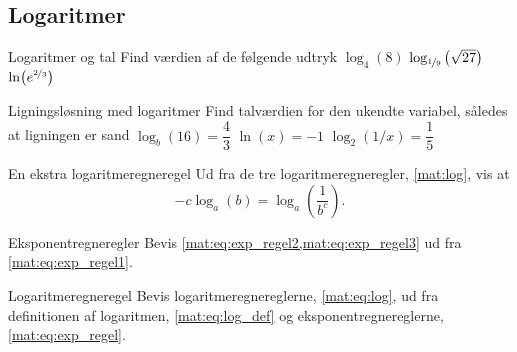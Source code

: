\subsection*{Logaritmer}
\begin{opgave}[1]{Logaritmer og tal}
    Find værdien af de følgende udtryk
    \opg $\log_{4}(8)$
    \opg $\log_{\nicefrac{1}{9}}\left(\sqrt{27}\right)$
    \opg $\ln(e^{\nicefrac{2}{3}})$
\end{opgave}
\begin{opgave}[2]{Ligningsløsning med logaritmer}
Find talværdien for den ukendte variabel, således at ligningen er sand
    \opg $\log_{b}(16) = \dfrac{4}{3}$
    \opg $\ln(x) = -1$
    \opg $\log_{2}(1/x)=\dfrac{1}{5}$
\end{opgave}
\begin{opgave}[3]{En ekstra logaritmeregneregel}
    Ud fra de tre logaritmeregneregler, \cref{mat:log}, vis at
    $$
    -c\log_a(b)=\log_a\left(\frac{1}{b^c}\right).
    $$
\end{opgave}
\begin{opgave}[4]{Eksponentregneregler}
    Bevis \cref{mat:eq:exp_regel2,mat:eq:exp_regel3} ud fra \cref{mat:eq:exp_regel1}. 
\end{opgave}
\begin{opgave}[4]{Logaritmeregneregel}
    Bevis logaritmeregnereglerne, \cref{mat:eq:log}, ud fra definitionen af logaritmen, \cref{mat:eq:log_def} og eksponentregnereglerne, \cref{mat:eq:exp_regel}.
\end{opgave}